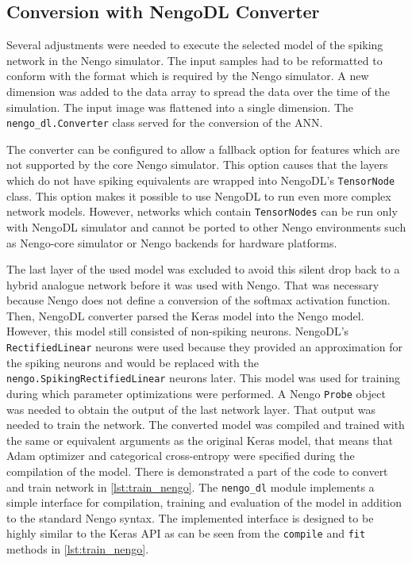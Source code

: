 \subsection{Conversion with NengoDL Converter}
Several adjustments were needed to execute the selected model of the spiking network in the Nengo simulator. The input samples had to be reformatted to conform with the format which is required by the Nengo simulator. A new dimension was added to the data array to spread the data over the time of the simulation. The input image was flattened into a single dimension. The \texttt{nengo\_dl.Converter} class served for the conversion of the ANN. \par
The converter can be configured to allow a fallback option for features which are not supported by the core Nengo simulator. This option causes that the layers which do not have spiking equivalents are wrapped into NengoDL's \texttt{TensorNode} class. This option makes it possible to use NengoDL to run even more complex network models. However, networks which contain \texttt{TensorNodes} can be run only with NengoDL simulator and cannot be ported to other Nengo environments such as Nengo-core simulator or Nengo backends for hardware platforms. \par
The last layer of the used model was excluded to avoid this silent drop back to a hybrid analogue network before it was used with Nengo. That was necessary because Nengo does not define a conversion of the softmax activation function. Then, NengoDL converter parsed the Keras model into the Nengo model. However, this model still consisted of non-spiking neurons. NengoDL's \texttt{RectifiedLinear} neurons were used because they provided an approximation for the spiking neurons and would be replaced with the \texttt{nengo.SpikingRectifiedLinear} neurons later. This model was used for training during which parameter optimizations were performed. A Nengo \texttt{Probe} object was needed to obtain the output of the last network layer. That output was needed to train the network. The converted model was compiled and trained with the same or equivalent arguments as the original Keras model, that means that Adam optimizer and categorical cross-entropy were specified during the compilation of the model. There is demonstrated a part of the code to convert and train network in \cref{lst:train_nengo}. The \texttt{nengo\_dl} module implements a simple interface for compilation, training and evaluation of the model in addition to the standard Nengo syntax. The implemented interface is designed to be highly similar to the Keras API as can be seen from the \texttt{compile} and \texttt{fit} methods in \cref{lst:train_nengo}. \pagebreak

